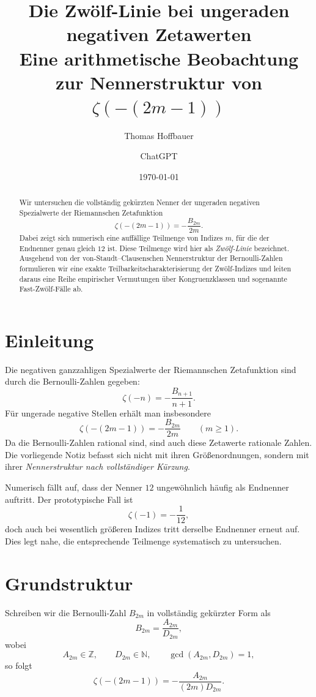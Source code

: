 \documentclass[11pt,a4paper]{article}
\title{\textbf{Die Zwölf-Linie bei ungeraden negativen Zetawerten}\\
	\large Eine arithmetische Beobachtung zur Nennerstruktur von $\zeta(-(2m-1))$}
\author{Thomas Hoffbauer \and ChatGPT}
\date{\today}
\theoremstyle{definition}
\theoremstyle{plain}
\theoremstyle{remark}
\begin{document}
	\maketitle
	
	\begin{abstract}
		Wir untersuchen die vollständig gekürzten Nenner der ungeraden negativen Spezialwerte der Riemannschen Zetafunktion
		\[
		\zeta(-(2m-1))=-\frac{B_{2m}}{2m}.
		\]
		Dabei zeigt sich numerisch eine auffällige Teilmenge von Indizes $m$, für die der Endnenner genau gleich $12$ ist. Diese Teilmenge wird hier als \emph{Zwölf-Linie} bezeichnet. Ausgehend von der von-Staudt--Clausenschen Nennerstruktur der Bernoulli-Zahlen formulieren wir eine exakte Teilbarkeitscharakterisierung der Zwölf-Indizes und leiten daraus eine Reihe empirischer Vermutungen über Kongruenzklassen und sogenannte Fast-Zwölf-Fälle ab.
	\end{abstract}
	
	\section{Einleitung}
	
	Die negativen ganzzahligen Spezialwerte der Riemannschen Zetafunktion sind durch die Bernoulli-Zahlen gegeben:
	\[
	\zeta(-n)=-\frac{B_{n+1}}{n+1}.
	\]
	Für ungerade negative Stellen erhält man insbesondere
	\[
	\zeta(-(2m-1))=-\frac{B_{2m}}{2m}
	\qquad (m\ge 1).
	\]
	Da die Bernoulli-Zahlen rational sind, sind auch diese Zetawerte rationale Zahlen. Die vorliegende Notiz befasst sich nicht mit ihren Größenordnungen, sondern mit ihrer \emph{Nennerstruktur nach vollständiger Kürzung}.
	
	Numerisch fällt auf, dass der Nenner $12$ ungewöhnlich häufig als Endnenner auftritt. Der prototypische Fall ist
	\[
	\zeta(-1)=-\frac{1}{12},
	\]
	doch auch bei wesentlich größeren Indizes tritt derselbe Endnenner erneut auf. Dies legt nahe, die entsprechende Teilmenge systematisch zu untersuchen.
	
	\section{Grundstruktur}
	
	Schreiben wir die Bernoulli-Zahl $B_{2m}$ in vollständig gekürzter Form als
	\[
	B_{2m}=\frac{A_{2m}}{D_{2m}},
	\]
	wobei
	\[
	A_{2m}\in\mathbb{Z},\qquad D_{2m}\in\mathbb{N},\qquad \gcd(A_{2m},D_{2m})=1,
	\]
	so folgt
	\[
	\zeta(-(2m-1))=-\frac{A_{2m}}{(2m)D_{2m}}.
	\]
	
\end{document}
